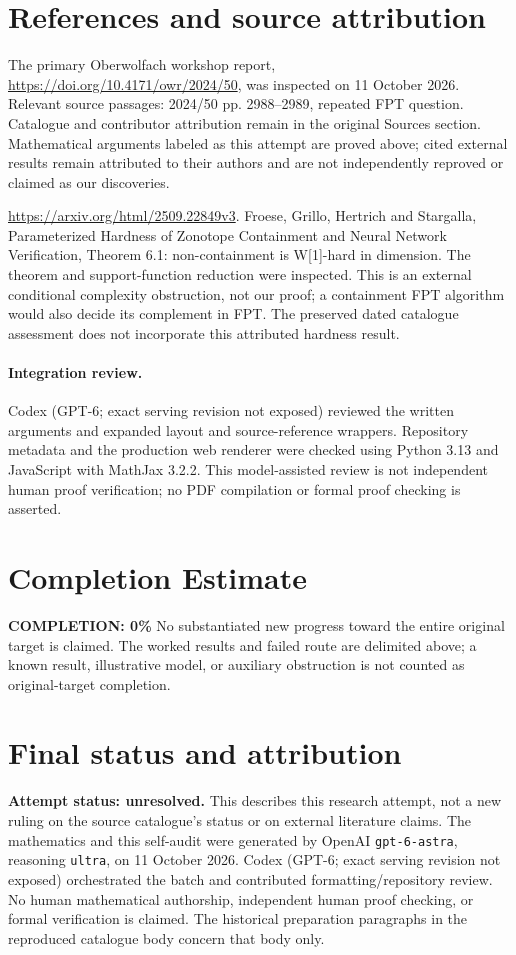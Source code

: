 \documentclass[11pt]{article}
\begin{document}
\section{References and source attribution}
The primary Oberwolfach workshop report, \url{https://doi.org/10.4171/owr/2024/50}, was inspected on 11 October 2026. Relevant source passages: 2024/50 pp. 2988--2989, repeated FPT question. Catalogue and contributor attribution remain in the original Sources section. Mathematical arguments labeled as this attempt are proved above; cited external results remain attributed to their authors and are not independently reproved or claimed as our discoveries.

\url{https://arxiv.org/html/2509.22849v3}. Froese, Grillo, Hertrich and Stargalla, Parameterized Hardness of Zonotope Containment and Neural Network Verification, Theorem 6.1: non-containment is W[1]-hard in dimension. The theorem and support-function reduction were inspected. This is an external conditional complexity obstruction, not our proof; a containment FPT algorithm would also decide its complement in FPT. The preserved dated catalogue assessment does not incorporate this attributed hardness result.


\paragraph{Integration review.} Codex (GPT-6; exact serving revision not exposed) reviewed the written arguments and expanded layout and source-reference wrappers. Repository metadata and the production web renderer were checked using Python 3.13 and JavaScript with MathJax 3.2.2. This model-assisted review is not independent human proof verification; no PDF compilation or formal proof checking is asserted.

\section{Completion Estimate}
\noindent\textbf{COMPLETION: 0\%}
No substantiated new progress toward the entire original target is claimed. The worked results and failed route are delimited above; a known result, illustrative model, or auxiliary obstruction is not counted as original-target completion.

\section{Final status and attribution}
\textbf{Attempt status: unresolved.} This describes this research attempt, not a new ruling on the source catalogue's status or on external literature claims.
The mathematics and this self-audit were generated by OpenAI \texttt{gpt-6-astra}, reasoning \texttt{ultra}, on 11 October 2026. Codex (GPT-6; exact serving revision not exposed) orchestrated the batch and contributed formatting/repository review. No human mathematical authorship, independent human proof checking, or formal verification is claimed. The historical preparation paragraphs in the reproduced catalogue body concern that body only.
\end{document}

